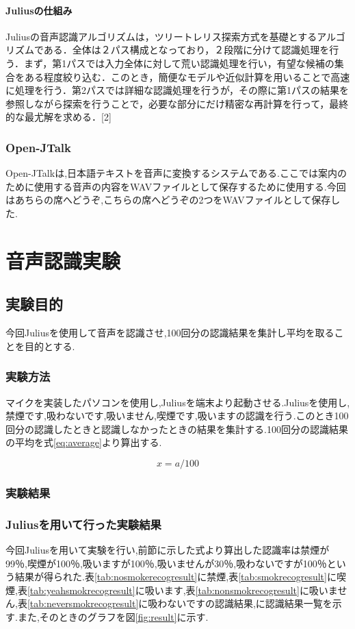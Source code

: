 \documentclass[12pt,oneside]{sotsuken_paper}
\begin{document}
\subsubsection{Juliusの仕組み}
Juliusの音声認識アルゴリズムは，ツリートレリス探索方式を基礎とするアルゴリズムである．全体は２パス構成となっており，２段階に分けて認識処理を行う．まず，第1パスでは入力全体に対して荒い認識処理を行い，有望な候補の集合をある程度絞り込む．このとき，簡便なモデルや近似計算を用いることで高速に処理を行う．第2パスでは詳細な認識処理を行うが，その際に第1パスの結果を参照しながら探索を行うことで，必要な部分にだけ精密な再計算を行って，最終的な最尤解を求める．[2]


\subsection{Open-JTalk}
Open-JTalkは,日本語テキストを音声に変換するシステムである.ここでは案内のために使用する音声の内容をWAVファイルとして保存するために使用する.今回はあちらの席へどうぞ,こちらの席へどうぞの2つをWAVファイルとして保存した.


\chapter{音声認識実験}
\section{実験目的}
今回Juliusを使用して音声を認識させ,100回分の認識結果を集計し平均を取ることを目的とする.


\subsection{実験方法}
マイクを実装したパソコンを使用し,Juliusを端末より起動させる.Juliusを使用し,禁煙です,吸わないです,吸いません,喫煙です,吸いますの認識を行う.このとき100回分の認識したときと認識しなかったときの結果を集計する.100回分の認識結果の平均を式\ref{eq:average}より算出する.

\setcounter{equation}{0}
\begin{equation}
  x = a / 100
\end{equation}
\label{eq:average}


\subsection{実験結果}
\subsection{Juliusを用いて行った実験結果}
今回Juliusを用いて実験を行い,前節に示した式より算出した認識率は禁煙が99％,喫煙が100％,吸いますが100％,吸いませんが30％,吸わないですが100％という結果が得られた.表\ref{tab:nosmokerecogresult}に禁煙,表\ref{tab:smokrecogresult}に喫煙,表\ref{tab:yeahsmokrecogresult}に吸います,表\ref{tab:nonsmokrecogresult}に吸いません,表\ref{tab:neversmokrecogresult}に吸わないですの認識結果,\label{tab:result}に認識結果一覧を示す.また,そのときのグラフを図\ref{fig:result}に示す.
\end{document}
